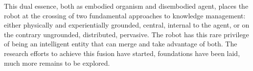 This dual essence, both as embodied organism and disembodied agent, places the
robot at the crossing of two fundamental approaches to knowledge management:
either physically and experientially grounded, central, internal to the agent,
or on the contrary ungrounded, distributed, pervasive. The robot has this rare
privilege of being an intelligent entity that can merge and take advantage of
both. The research efforts to achieve this fusion have started, foundations have
been laid, much more remains to be explored.





